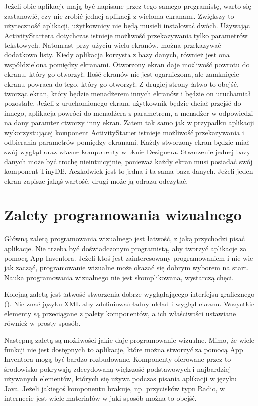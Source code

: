 Jeżeli obie aplikacje mają być napisane przez tego samego programistę, warto się zastanowić, czy nie zrobić jednej aplikacji z wieloma ekranami. Zwiększy to użyteczność aplikacji, użytkownicy nie będą musieli instalować dwóch. Używając ActivityStartera dotychczas istnieje możliwość przekazywania tylko parametrów tekstowych. Natomiast przy użyciu wielu ekranów, można przekazywać dodatkowo listy. Kiedy aplikacja korzysta z bazy danych, również jest ona współdzielona pomiędzy ekranami. Otworzony ekran daje możliwość powrotu do ekranu, który go otworzył. Ilość ekranów nie jest ogarniczona, ale zamknięcie ekranu powraca do tego, który go otworzył. Z drugiej strony łatwo to obejść, tworząc ekran, który będzie menadżerem innych ekranów i będzie on uruchamiał pozostałe. Jeżeli z uruchomionego ekranu użytkownik będzie chciał przejść do innego, aplikacja powróci do menadżera z parametrem, a menadżer w odpowiedzi na dany paramter otworzy inny ekran. Zatem tak samo jak w przypadku aplikacji wykorzystującej komponent ActivityStarter istnieje możliwość przekazywania i odbierania parametrów pomiędzy ekranami. Każdy stworzony ekran będzie miał swój wygląd oraz własne komponenty w oknie Designera. Stworzenie jednej bazy danych może być trochę nieintuicyjnie, ponieważ każdy ekran musi posiadać swój komponent TinyDB. Aczkolwiek jest to jedna i ta sama baza danych. Jeżeli jeden ekran zapisze jakąś wartość, drugi może ją odrazu odczytać.




\section{Zalety programowania wizualnego}

Główną zaletą programowania wizualnego jest łatwość, z jaką przychodzi pisać aplikacje. Nie trzeba być doświadczonym programistą, aby tworzyć aplikacje za pomocą App Inventora. Jeżeli ktoś jest zainteresowany programowaniem i nie wie jak zacząć, programowanie wizualne może okazać się dobrym wyborem na start. Nauka programowania wizualnego nie jest skomplikowana, wystarczą chęci. 

Kolejną zaletą jest łatwość stworzenia dobrze wyglądającego interfejsu graficznego (). Nie znać języku XML aby zdefiniować ładny układ i wygląd ekranu. Wszystkie elementy są przeciągane z palety komponentów, a ich właściwości ustawiane również w prosty sposób.

Następną zaletą są możliwości jakie daje programowanie wizualne. Mimo, że wiele funkcji nie jest dostępnych to aplikacje, które można stworzyć za pomocą App Inventora mogą być bardzo rozbudowane. Komponenty oferowane przez to środowisko pokrywają zdecydowaną większość podstawowych i najbardziej używanych elementów, których się używa podczas pisania aplikacji w języku Java. Jeżeli jakiegoś komponentu brakuje, np. przycisków typu Radio, w internecie jest wiele materiałów w jaki sposób można to obejść.


